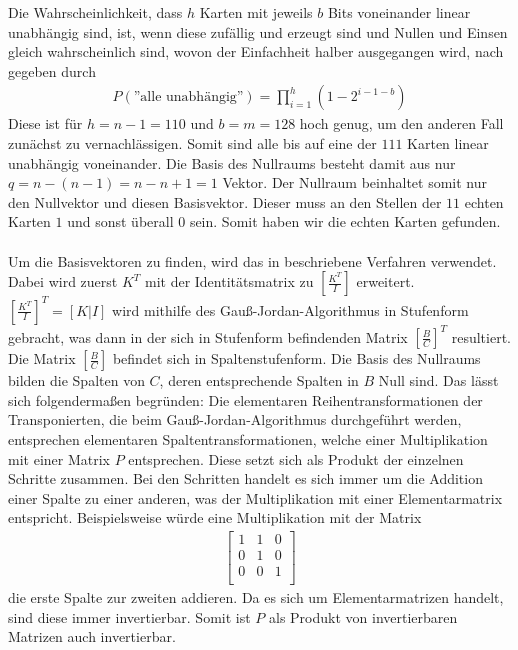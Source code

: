 \documentclass[a4paper,10pt,ngerman]{scrartcl}
\begin{document}
Die Wahrscheinlichkeit, dass $h$ Karten mit jeweils $b$ Bits voneinander linear unabhängig sind, ist, wenn diese zufällig und erzeugt sind und Nullen und Einsen gleich wahrscheinlich sind, wovon der Einfachheit halber ausgegangen wird, nach \cite{WEBSITE:1} gegeben durch
\begin{align*}
P(\text{''alle unabhängig''}) = \prod^h_{i=1} (1-2^{i-1-b})
\end{align*}
Diese ist für $h=n-1=110$ und $b=m=128$ hoch genug, um den anderen Fall zunächst zu vernachlässigen. Somit sind alle bis auf eine der $111$ Karten linear unabhängig voneinander. Die Basis des Nullraums besteht damit aus nur $q=n-(n-1)=n-n+1=1$ Vektor. Der Nullraum beinhaltet somit nur den Nullvektor und diesen Basisvektor. Dieser muss an den Stellen der $11$ echten Karten $1$ und sonst überall $0$ sein. Somit haben wir die echten Karten gefunden. \\\\
Um die Basisvektoren zu finden, wird das in \cite{WEBSITE:2} beschriebene Verfahren verwendet. Dabei wird zuerst $K^T$ mit der Identitätsmatrix zu $\left[\frac{K^T}{I}\right]$ erweitert. $\left[\frac{K^T}{I}\right]^T=[K|I]$ wird mithilfe des Gauß-Jordan-Algorithmus in Stufenform gebracht, was dann in der sich in Stufenform befindenden Matrix $\left[\frac{B}{C}\right]^T$ resultiert. Die Matrix $\left[\frac{B}{C}\right]$ befindet sich in Spaltenstufenform. Die Basis des Nullraums bilden die Spalten von $C$, deren entsprechende Spalten in $B$ Null sind. Das lässt sich folgendermaßen begründen: Die elementaren Reihentransformationen der Transponierten, die beim Gauß-Jordan-Algorithmus durchgeführt werden, entsprechen elementaren Spaltentransformationen, welche einer Multiplikation mit einer Matrix $P$ entsprechen. Diese setzt sich als Produkt der einzelnen Schritte zusammen. Bei den Schritten handelt es sich immer um die Addition einer Spalte zu einer anderen, was der Multiplikation mit einer Elementarmatrix entspricht. Beispielsweise würde eine Multiplikation mit der Matrix
\begin{align*}
\left[\begin{array}{ccc}
1 & 1 & 0 \\
0 & 1 & 0 \\
0 & 0 & 1 \\
\end{array}\right]
\end{align*}
die erste Spalte zur zweiten addieren. Da es sich um Elementarmatrizen handelt, sind diese immer invertierbar. Somit ist $P$ als Produkt von invertierbaren Matrizen auch invertierbar. \\
\end{document}

